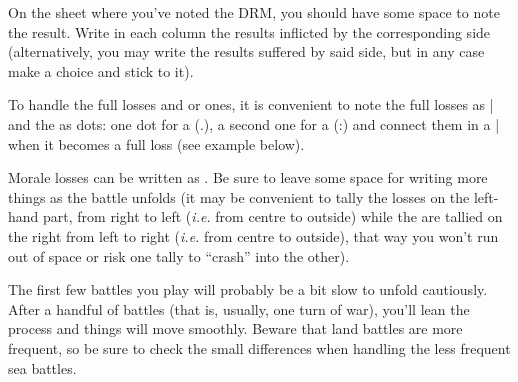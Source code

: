 \begin{playtip}
  On the sheet where you've noted the DRM, you should have some space to note
  the result. Write in each column the results inflicted by the corresponding
  side (alternatively, you may write the results suffered by said side, but in
  any case make a choice and stick to it).

  To handle the full losses and \texttu or \texttd ones, it is convenient to
  note the full losses as | and the  as dots: one dot for a \texttu
  (.), a second one for a \texttd (:) and connect them in a | when it becomes
  a full loss (see example below).

  Morale losses can be written as \textetoile. Be sure to leave some space for
  writing more things as the battle unfolds (it may be convenient to tally the
  losses on the left-hand part, from right to left (\emph{i.e.} from centre to
  outside) while the \textetoile are tallied on the right from left to right
  (\emph{i.e.} from centre to outside), that way you won't run out of space or
  risk one tally to ``crash'' into the other).

  \smallskip

  The first few battles you play will probably be a bit slow to unfold
  cautiously. After a handful of battles (that is, usually, one turn of war),
  you'll lean the process and things will move smoothly. Beware that land
  battles are more frequent, so be sure to check the small differences when
  handling the less frequent sea battles.
\end{playtip}

\newcommand{\chMilBattleRoll}[4][]{\bparag[#4.] Both sides roll for #4 of
  the #2 day. \ifx#1\relax\else At sea, the side that suffered the most
  \textetoile previously in this battle has a \bonus{-1} DRM (note that this
  is \textbf{not} necessarily the side with less Morale or less remaining
  Morale); in case of tie, nobody gets the malus.\fi #3 results.}
\newcommand{\chMilFireRoll}[3][]{\chMilBattleRoll[#1]{#2}{#3}{Fire}}
\newcommand{\chMilFireTech}{
  \bparag[Technology.] On the European map, stack with \TREN technology and no
  \ARMY counter does not roll for Fire. A stack with \TREN technology only
  apply the \textetoile. A stack with \TARQ technology only does half (round
  down to lesser \texttu) the indicated losses. A stack with \NGD and no \VGD
  only does half (round up to larger \texttu) the indicated losses.}
\newcommand{\chMilMoraleCheck}{
  \bparag[Rout.] If one side has suffered at least as many \textetoile than
  its \terme{Morale}, it is immediately routed. It loses the battle and its
  opponent wins it. Go to~\ref{chMilitary:Battle:Pursuit}.}
\newcommand{\chMilWindAdvRetreat}{
  \bparag[Retreat.] At sea (only), the side with \terme{Wind advantage} may
  decide to retreat. If it does, it loses the battle and its opponent wins it
  the but there is no pursuit. Go directly to~\ref{chMilitary:Battle:Loss
    modifications}.}
\newcommand{\chMilShockRoll}[1]{\chMilBattleRoll[t]{#1}{Tally}{Shock}}

